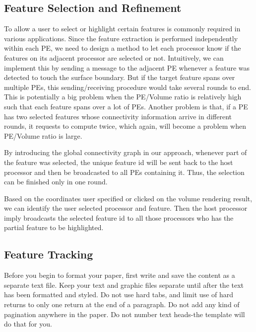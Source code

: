 \documentclass[10pt, conference, compsocconf]{IEEEtran}
\begin{document}
\subsection{Feature Selection and Refinement}
To allow a user to select or highlight certain features is commonly required in various applications. 
Since the feature extraction is performed independently within each PE, 
we need to design a method to let each processor know if the features on its adjacent processor are selected or not.  
Intuitively, we can implement this by sending a message to the adjacent PE whenever a feature was detected to touch the surface boundary. But if the target feature spans over multiple PEs, this sending/receiving procedure would take several rounds to end. This is potentially a big problem when the PE/Volume ratio is relatively high such that each feature spans over a lot of PEs. Another problem is that, if a PE has two selected features whose connectivity information arrive in different rounds, it requests to compute twice, which again, will become a problem when PE/Volume ratio is large.

By introducing the global connectivity graph in our approach, whenever part of the feature was selected, the unique feature id will be sent back to the host processor and then be broadcasted to all PEs containing it. Thus, the selection can be finished only in one round.

Based on the coordinates user specified or clicked on the volume rendering result, 
we can identify the user selected processor and feature.
Then the host processor imply broadcasts the selected feature id to all those processors who has the partial feature to be highlighted.


\subsection{Feature Tracking}
Before you begin to format your paper, first write and save the content as a separate text file. Keep your text and graphic files separate until after the text has been formatted and styled. Do not use hard tabs, and limit use of hard returns to only one return at the end of a paragraph. Do not add any kind of pagination anywhere in the paper. Do not number text heads-the template will do that for you.
\end{document}
